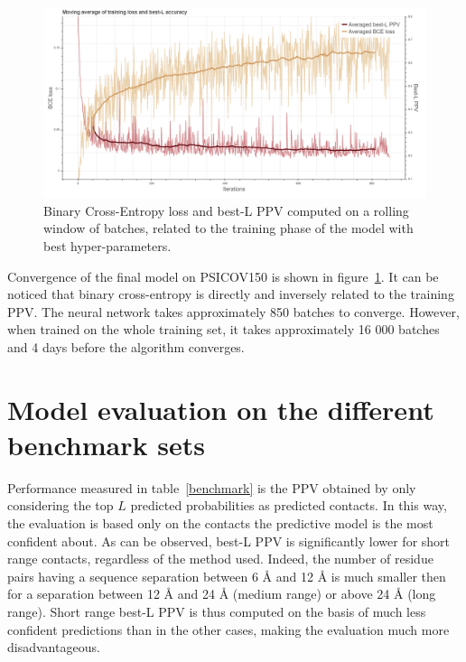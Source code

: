     \begin{figure}[H]
        \begin{center}
            \includegraphics[width=\textwidth, keepaspectratio]{imgs/loss.png}
            \caption{Binary Cross-Entropy loss and best-L PPV computed on
              a rolling window of batches, related to the training phase of the model
              with best hyper-parameters.}
            \label{lossandppv}
        \end{center}
    \end{figure}

    Convergence of the final model on PSICOV150 is shown in figure~\ref{lossandppv}.
    It can be noticed that binary cross-entropy is directly and inversely
    related to the training PPV. The neural network takes approximately 850
    batches to converge. However, when trained on the whole training set, it takes
    approximately 16 000 batches and 4 days before the algorithm converges.

\section{Model evaluation on the different benchmark sets}

    Performance measured in table~\ref{benchmark} is the PPV obtained
    by only considering the top $L$ predicted probabilities as predicted
    contacts. In this way, the evaluation is based only on the contacts
    the predictive model is the most confident about.
    As can be observed, best-L PPV is significantly lower for short range contacts,
    regardless of the method used. Indeed, the number of residue pairs having a
    sequence separation between 6 \AA{} and 12 \AA{} is much smaller then for a
    separation between 12 \AA{} and 24 \AA{} (medium range) or above 24 \AA{} (long range).
    Short range best-L PPV is thus computed on the basis of much less confident
    predictions than in the other cases, making the evaluation much more disadvantageous.

